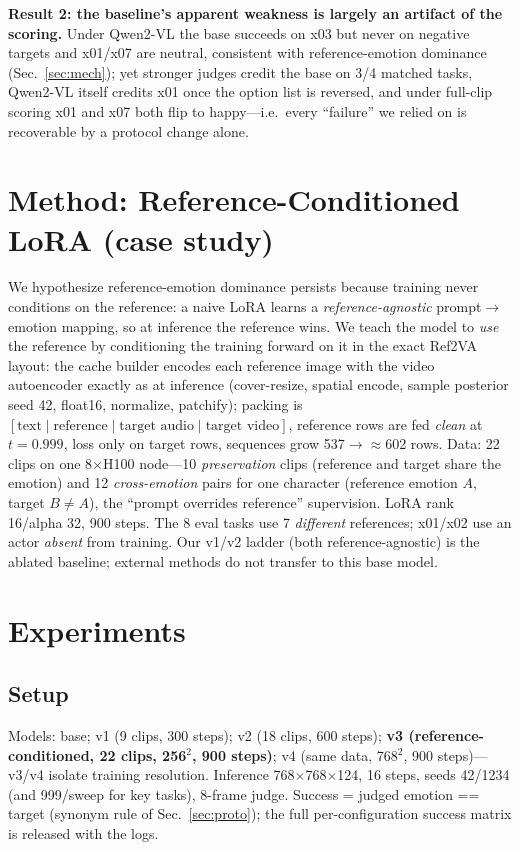 \documentclass[conference]{IEEEtran}
\begin{document}
\textbf{Result 2: the baseline's apparent weakness is largely an artifact of the scoring.} Under Qwen2-VL
the base succeeds on x03 but never on negative targets and x01/x07 are neutral, consistent with
reference-emotion dominance (Sec.~\ref{sec:mech}); yet stronger judges credit the base on 3/4 matched
tasks, Qwen2-VL itself credits x01 once the option list is reversed, and under full-clip scoring x01 and
x07 both flip to happy---i.e.\ every ``failure'' we relied on is recoverable by a protocol change alone.

\section{Method: Reference-Conditioned LoRA (case study)}
We hypothesize reference-emotion dominance persists because training never conditions on the reference:
a naive LoRA learns a \emph{reference-agnostic} prompt$\rightarrow$emotion mapping, so at inference the
reference wins. We teach the model to \emph{use} the reference by conditioning the training forward on
it in the exact Ref2VA layout: the cache builder encodes each reference image
with the video autoencoder exactly as at inference (cover-resize, spatial encode, sample posterior seed
42, float16, normalize, patchify); packing is
$[\text{text}\mid\text{reference}\mid\text{target audio}\mid\text{target video}]$, reference rows are fed
\emph{clean} at $t{=}0.999$, loss only on target rows, sequences grow 537$\rightarrow{\approx}$602 rows.
Data: 22 clips on one 8$\times$H100 node---10 \emph{preservation} clips (reference and target share the
emotion) and 12 \emph{cross-emotion} pairs for one character (reference emotion $A$, target $B\neq A$),
the ``prompt overrides reference'' supervision. LoRA rank 16/alpha 32, 900 steps. The 8 eval tasks use 7
\emph{different} references; x01/x02 use an actor \emph{absent} from training. Our v1/v2 ladder (both
reference-agnostic) is the ablated baseline; external methods do not transfer to this base model.



\section{Experiments}
\label{sec:setup}
\subsection{Setup}
Models: base; v1 (9 clips, 300 steps); v2 (18 clips, 600 steps); \textbf{v3 (reference-conditioned,
22 clips, 256$^2$, 900 steps)}; v4 (same data, 768$^2$, 900 steps)---v3/v4 isolate training
resolution. Inference 768$\times$768$\times$124, 16 steps, seeds 42/1234 (and 999/sweep for key
tasks), 8-frame judge. Success = judged emotion == target (synonym rule of Sec.~\ref{sec:proto}); the full per-configuration success matrix is released with the logs.
\end{document}
